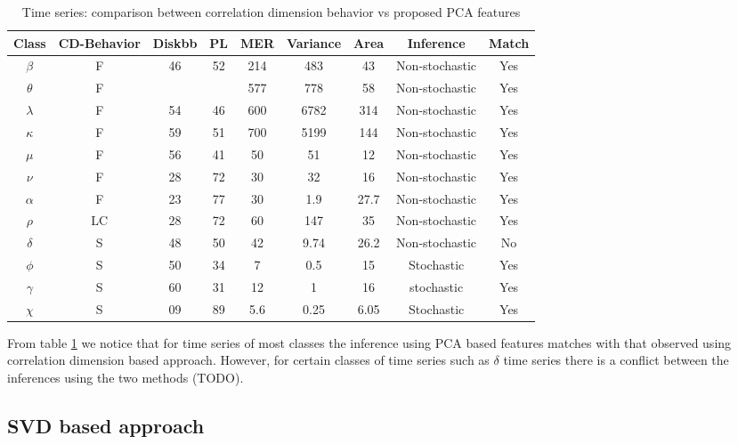 \documentclass[10pt,conference]{IEEEtran}
\begin{document}
\begin{table}[t]
\caption{Time series: comparison between correlation dimension behavior vs proposed PCA features }
\begin{center}
\begin{tabular}{|c|c|c|c|c|c|c|c|c|}
\hline
Class & CD-Behavior & Diskbb & PL & MER & Variance & Area & Inference & Match\\
\hline
$\beta$ & F & 46 & 52 & 214 & 483 & 43 & Non-stochastic & Yes \\
\hline
$\theta$ & F &  & & 577 & 778 & 58&Non-stochastic & Yes \\
\hline
$\lambda$ & F & 54 & 46 & 600 & 6782 & 314 & Non-stochastic & Yes \\
\hline
$\kappa$ & F & 59 & 51 & 700 & 5199 & 144 & Non-stochastic & Yes \\
\hline
$\mu$ & F & 56 & 41 & 50 & 51 & 12 & Non-stochastic & Yes \\
\hline
$\nu$ & F & 28 & 72 & 30 & 32 & 16 & Non-stochastic & Yes \\
\hline
$\alpha$ & F & 23 & 77 & 30 & 1.9 & 27.7 & Non-stochastic & Yes \\
\hline
$\rho$ & LC & 28 & 72 & 60 & 147 & 35 & Non-stochastic & Yes \\
\hline
$\delta$ & S & 48 & 50 & 42 & 9.74 & 26.2 & Non-stochastic & No \\
\hline
$\phi$ & S & 50 & 34 & 7 & 0.5 & 15 & Stochastic & Yes \\
\hline
$\gamma$ & S & 60 & 31 & 12 & 1 & 16 & stochastic & Yes \\
\hline
$\chi$ & S & 09 & 89 & 5.6 & 0.25 & 6.05 & Stochastic & Yes \\
\hline
\end{tabular}
\label{tab:results}
\end{center}
\end{table}

From table \ref{tab:results} we notice that for time series of most classes the inference using PCA based features matches with  that observed using correlation dimension based approach. However, for certain classes of time series such as $\delta$ time series there is a conflict between the inferences using the two methods (TODO).

\subsection{SVD based approach}
\end{document}
